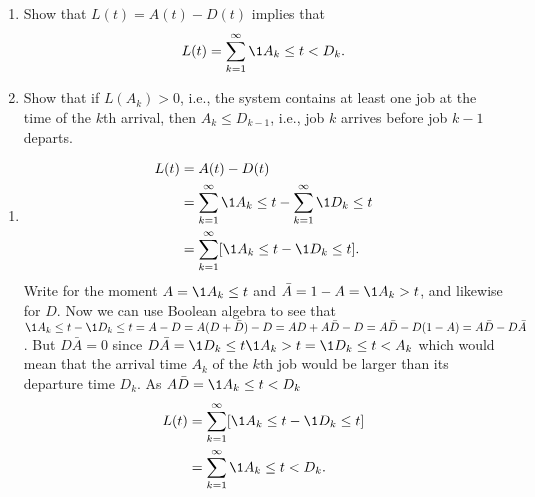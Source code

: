 \begin{question}
  \begin{enumerate}
  \item 
  Show that $L(t) = A(t)-D(t)$ implies that 
  \begin{equation*}
    L(t) = \sum_{k=1}^\infty \1{A_k \leq t < D_k}.
  \end{equation*}
\item Show that if $L(A_k)>0$, i.e., the system contains at least one
  job at the time of the $k$th arrival, then $A_k \leq D_{k-1}$, i.e.,
  job $k$ arrives before job $k-1$ departs.
  \end{enumerate}
\begin{solution}
  \begin{enumerate}
  \item 
  \begin{equation*}
    \begin{split}
      L(t)
&= A(t) - D(t) \\
&= \sum_{k=1}^\infty \1{A_k \leq t} -  \sum_{k=1}^\infty \1{D_k \leq t} \\
&= \sum_{k=1}^\infty [\1{A_k \leq t} -  \1{D_k \leq t}].
    \end{split}
  \end{equation*}
  Write for the moment $A=\1{A_k \leq t}$ and
  $\bar A = 1- A = \1{A_k > t}$, and likewise for $D$. Now we can use
  Boolean algebra to see that
  $\1{A_k \leq t} - \1{D_k \leq t} = A-D = A(D+\bar D) -D = AD +
  A\bar D - D = A\bar D - D(1-A) = A\bar D - D \bar A$.
  But $D \bar A = 0$ since
  $D \bar A = \1{D_k \leq t} \1{A_k > t} = \1{D_k \leq t < A_k}$
  which would mean that the arrival time $A_k$ of the $k$th job would
  be larger than its departure time $D_k$. As $A \bar D = \1{A_k \leq t < D_k}$
  \begin{equation*}
    \begin{split}
      L(t)
&= \sum_{k=1}^\infty [\1{A_k \leq t} -  \1{D_k \leq t}] \\
&= \sum_{k=1}^\infty \1{A_k \leq t < D_k}.
    \end{split}
  \end{equation*}


\end{enumerate}
\end{solution}
\end{question}
